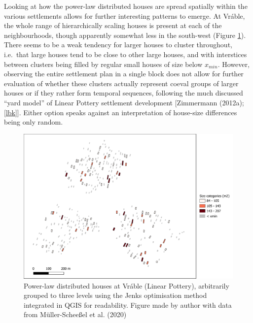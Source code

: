 \documentclass[
  12pt,
]{book}
\begin{document}
Looking at how the power-law distributed houses are spread spatially within the various settlements allows for further interesting patterns to emerge. At Vráble, the whole range of hierarchically scaling houses is present at each of the neighbourhoods, though apparently somewhat less in the south-west (Figure \ref{fig:06-vrable-map}). There seems to be a weak tendency for larger houses to cluster throughout, i.e.~that large houses tend to be close to other large houses, and with interstices between clusters being filled by regular small houses of size below \(x_{min}\). However, observing the entire settlement plan in a single block does not allow for further evaluation of whether these clusters actually represent coeval groups of larger houses or if they rather form temporal sequences, following the much discussed ``yard model'' of Linear Pottery settlement development {[}Zimmermann (2012a); \ref{lbk}{]}. Either option speaks against an interpretation of house-size differences being only random.

\begin{figure}
\hypertarget{fig:06-vrable-map}{%
\centering
\includegraphics{Results/fig06_vrable_pl.pdf}
\caption{Power-law distributed houses at Vráble (Linear Pottery), arbitrarily grouped to three levels using the Jenks optimisation method integrated in QGIS for readability. Figure made by author with data from Müller-Scheeßel et al. (2020)}\label{fig:06-vrable-map}
}
\end{figure}
\end{document}
